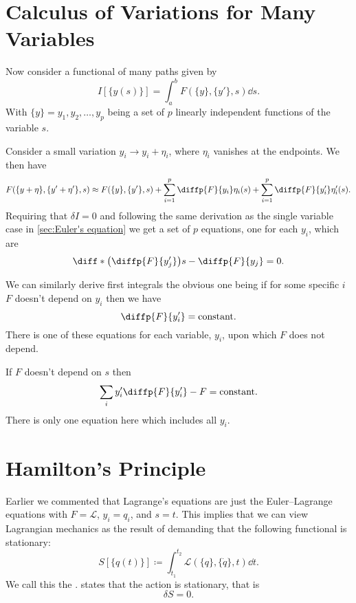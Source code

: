 \documentclass[fleqn]{NotesClass}
\newcommand*{\lagrangian}{\mathcal{L}}
\begin{document}
    \section{Calculus of Variations for Many Variables}
    Now consider a functional of many paths given by
    \begin{equation}
        I[\{y(s)\}] = \int_a^b F(\{y\}, \{y'\}, s) \dd{s}.
    \end{equation}
    With \(\{y\} = y_1, y_2, \dotsc, y_p\) being a set of \(p\) linearly independent functions of the variable \(s\).
    
    Consider a small variation \(y_i \to y_i + \eta_i\), where \(\eta_i\) vanishes at the endpoints.
    We then have
    \begin{equation}
        F(\{y + \eta\}, \{y' + \eta'\}, s) \approx F(\{y\}, \{y'\}, s) + \sum_{i=1}^{p} \diffp{F}{y_i}\eta_i(s) + \sum_{i=1}^{p} \diffp{F}{y_i'}\eta_i'(s).
    \end{equation}
    Requiring that \(\delta I = 0\) and following the same derivation as the single variable case in \cref{sec:Euler's equation} we get a set of \(p\) equations, one for each \(y_i\), which are
    \begin{equation}
        \diff*{\left( \diffp{F}{y_j'} \right)}{s} - \diffp{F}{y_j} = 0.
    \end{equation}
    
    We can similarly derive first integrals the obvious one being if for some specific \(i\) \(F\) doesn't depend on \(y_i\) then we have
    \begin{equation}
        \diffp{F}{y_i'} = \text{constant.}
    \end{equation}
    There is one of these equations for each variable, \(y_i\), upon which \(F\) does not depend.
    
    If \(F\) doesn't depend on \(s\) then
    \begin{equation}\label{eqn:first integral second kind multivariable}
        \sum_i y_i'\diffp{F}{y_i'} - F = \text{constant.}
    \end{equation}
    There is only one equation here which includes all \(y_i\).
    
    \section{Hamilton's Principle}
    Earlier we commented that Lagrange's equations are just the Euler--Lagrange equations with \(F = \lagrangian\), \(y_i = q_i\), and \(s = t\).
    This implies that we can view Lagrangian mechanics as the result of demanding that the following functional is stationary:
    \begin{equation}
        S[\{q(t)\}] \coloneqq \int_{t_1}^{t_2} \lagrangian(\{q\}, \{\dot{q}\}, t) \dd{t}.
    \end{equation}
    We call this the .
     states that the action is stationary, that is
    \begin{equation}
        \delta S = 0.
    \end{equation}
    
\end{document}
